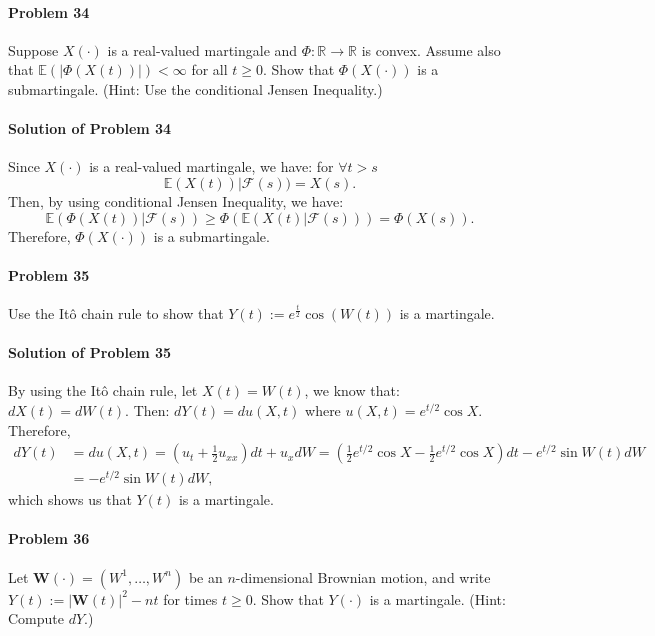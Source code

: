 \documentclass{article}
\begin{document}
\paragraph{Problem 34} Suppose $X(\cdot)$ is a real-valued martingale and $\Phi:\mathbb{R}\rightarrow\mathbb{R}$ is convex. Assume also that $\mathbb{E}(|\Phi(X(t))|)<\infty$ for all $t\geqslant 0$. Show that $\Phi(X(\cdot))$ is a submartingale. (Hint: Use the conditional Jensen Inequality.)

\paragraph{Solution of Problem 34} Since $X(\cdot)$ is a real-valued martingale, we have: for $\forall t>s$
\[\mathbb{E}(X(t))|\mathcal F(s))=X(s).\]
Then, by using conditional Jensen Inequality, we have:
\[\mathbb{E}(\Phi(X(t))|\mathcal F(s))\geqslant \Phi(\mathbb{E}(X(t)|\mathcal F(s)))=\Phi(X(s)).\]
Therefore, $\Phi(X(\cdot))$ is a submartingale.

\paragraph{Problem 35} Use the Itô chain rule to show that $Y(t):=e^{\frac{t}{2}}\cos(W(t))$ is a martingale.

\paragraph{Solution of Problem 35} By using the Itô chain rule, let $X(t) = W(t)$, we know that: $dX(t)= dW(t)$. Then: $dY(t)=d u(X,t)$ where $u(X,t)=e^{t/2}\cos X$. Therefore,
\begin{equation*}
\begin{aligned}
dY(t)&=du(X,t)=(u_t+\frac12 u_{xx})dt + u_x dW = \left(\frac12 e^{t/2}\cos X-\frac12 e^{t/2}\cos X\right)dt-e^{t/2}\sin W(t)dW\\
&= -e^{t/2}\sin W(t)dW,
\end{aligned}    
\end{equation*}
which shows us that $Y(t)$ is a martingale.


\paragraph{Problem 36} Let $\mathbf{W}(\cdot)=(W^1, \ldots, W^n)$ be an $n$-dimensional Brownian motion, and write $Y(t):=|\mathbf{W}(t)|^2-nt$ for times $t\geqslant 0$. Show that $Y(\cdot)$ is a martingale. (Hint: Compute $dY$.)
\end{document}

